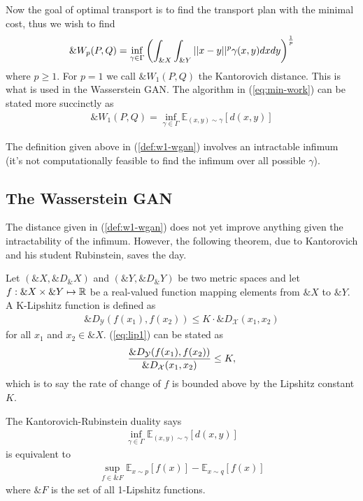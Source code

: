 Now the goal of optimal transport is to find the transport plan with
the minimal cost, thus we wish to find
\begin{align}%
  \label{eq:min-work}
  \&W_p(P, Q) = \inf_{\gamma \in \Gamma} \left( \int_{\&X}\int_{\&Y}||x-y||^p\gamma(x, y)dxdy \right)^{1 \over p}
\end{align}
where $p \geq 1$. For $p = 1$ we call $\&W_1(P, Q)$ the Kantorovich
distance. This is what is used in the Wasserstein GAN. The algorithm
in (\ref{eq:min-work}) can be stated more succinctly as
\begin{align}
  \label{def:w1-wgan}
  \&W_1(P, Q) = \inf_{\gamma \in \Gamma}\mathbb{E}_{(x,y) \sim \gamma}
  \left[ d(x, y) \right]
\end{align}
\begin{remark}
  The definition given above in (\ref{def:w1-wgan}) involves an
  intractable infimum (it's not computationally feasible to find the
  infimum over all possible $\gamma$).
\end{remark}

\subsection{The Wasserstein GAN}

The distance given in (\ref{def:w1-wgan}) does not yet improve
anything given the intractability of the infimum. However, the
following theorem, due to Kantorovich and his student Rubinstein,
saves the day.

\begin{definition}
  Let $(\&X, \&D_\&X)$ and $(\&Y, \&D_\&Y)$ be two metric spaces and
  let $f: \&X \times \&Y \mapsto \mathbb{R}$ be a real-valued function mapping
  elements from $\&X$ to $\&Y$. A \textnormal{\sffamily K-Lipshitz}
  function is defined as
  \begin{align}
    \label{eq:lip1}
    \&D_{\mathcal{Y}}(f(x_1), f(x_2)) \leq K \cdot {\&D}_{\mathcal{X}}(x_1, x_2)
  \end{align}
  for all $x_1$ and $x_2 \in \&X$. (\ref{eq:lip1}) can be stated as
  \begin{align}
    {\&D_{\mathcal{Y}}(f(x_1), f(x_2)) \over \&D_{\mathcal{X}}(x_1, x_2)} \leq K,
  \end{align}
  which is to say the rate of change of $f$ is bounded above by the
  Lipshitz constant $K$.
\end{definition}

\begin{theorem} The \textnormal{\sffamily Kantorovich-Rubinstein
    duality} says
  \begin{align}
    \inf_{\gamma \in \Gamma}\mathbb{E}_{(x,y) \sim \gamma} \left[d(x, y)\right]
  \end{align}
  is equivalent to
  \begin{align}
    \sup_{f \in \&{F}} \mathbb{E}_{x \sim p}\left[ f(x) \right] - \mathbb{E}_{x \sim q}\left[ f(x) \right]
  \end{align}
  where $\&{F}$ is the set of all 1-Lipshitz functions.
\end{theorem}

